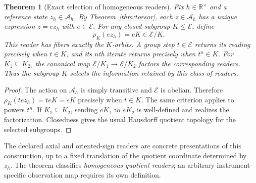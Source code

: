 \documentclass[10pt,letterpaper]{article}
\newtheorem{theorem}{Theorem}[section]
\theoremstyle{definition}\newtheorem{definition}[theorem]{Definition}
\newcommand{\RR}{\mathbb R}
\newcommand{\Ah}{\mathcal A_h}
\begin{document}
\begin{theorem}[Exact selection of homogeneous readers]\label{thm:readerselection}
Fix $h\in\RR^{\times}$ and a reference state $z_h\in\Ah$. By Theorem~\ref{thm:torsor}, each $z\in\Ah$ has a unique expression $z=e z_h$ with $e\in\mathcal E$. For any closed subgroup $K\leq\mathcal E$, define
\begin{equation}\label{eq:readergeneral}
 \rho_K(e z_h)=eK\in\mathcal E/K.
\end{equation}
This reader has fibers exactly the $K$-orbits. A group step $t\in\mathcal E$ returns its reading precisely when $t\in K$, and its $n$th iterate returns precisely when $t^n\in K$. For $K_1\subseteq K_2$, the canonical map $\mathcal E/K_1\to\mathcal E/K_2$ factors the corresponding readers. Thus the subgroup $K$ selects the information retained by this class of readers.
\end{theorem}
\begin{proof}
The action on $\Ah$ is simply transitive and $\mathcal E$ is abelian. Therefore $\rho_K(t e z_h)=teK=eK$ precisely when $t\in K$. The same criterion applies to powers $t^n$. If $K_1\subseteq K_2$, sending $eK_1$ to $eK_2$ is well-defined and realizes the factorization. Closedness gives the usual Hausdorff quotient topology for the selected subgroups.
\end{proof}

The declared axial and oriented-sign readers are concrete presentations of this construction, up to a fixed translation of the quotient coordinate determined by $z_h$. The theorem classifies \emph{homogeneous quotient readers}; an arbitrary instrument-specific observation map requires its own definition.
\end{document}
